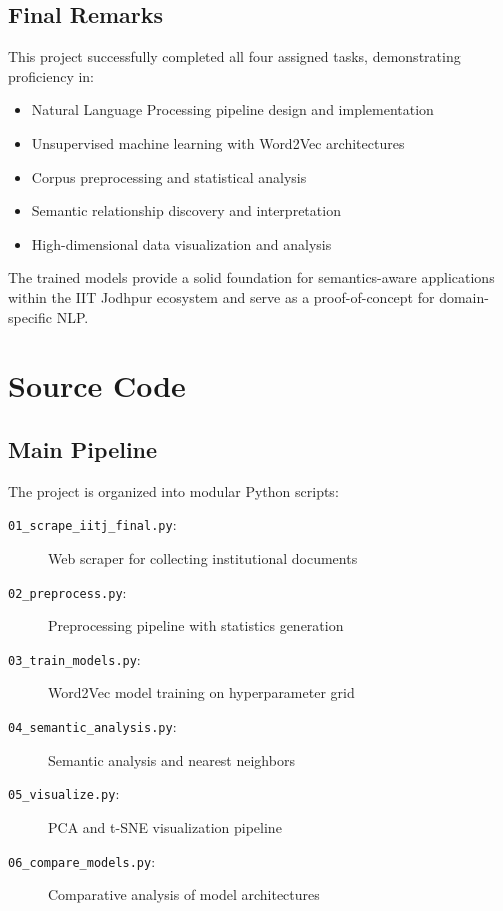 \documentclass[11pt,a4paper]{report}
\begin{document}
\section{Final Remarks}

This project successfully completed all four assigned tasks, demonstrating proficiency in:
\begin{itemize}
    \item Natural Language Processing pipeline design and implementation
    \item Unsupervised machine learning with Word2Vec architectures
    \item Corpus preprocessing and statistical analysis
    \item Semantic relationship discovery and interpretation
    \item High-dimensional data visualization and analysis
\end{itemize}

The trained models provide a solid foundation for semantics-aware applications within the IIT Jodhpur ecosystem and serve as a proof-of-concept for domain-specific NLP.

\newpage

\appendix

\chapter{Source Code}

\section{Main Pipeline}

The project is organized into modular Python scripts:

\begin{description}
    \item[\texttt{01\_scrape\_iitj\_final.py}:] Web scraper for collecting institutional documents
    \item[\texttt{02\_preprocess.py}:] Preprocessing pipeline with statistics generation
    \item[\texttt{03\_train\_models.py}:] Word2Vec model training on hyperparameter grid
    \item[\texttt{04\_semantic\_analysis.py}:] Semantic analysis and nearest neighbors
    \item[\texttt{05\_visualize.py}:] PCA and t-SNE visualization pipeline
    \item[\texttt{06\_compare\_models.py}:] Comparative analysis of model architectures
\end{description}
\end{document}

